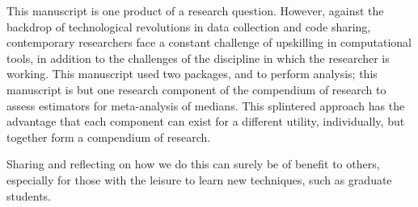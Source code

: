 \documentclass{article}
\begin{document}
This manuscript is one product of a research question. However, against the backdrop of technological revolutions in data collection and code sharing, contemporary researchers face a constant challenge of upskilling in computational tools, in addition to the challenges of the discipline in which the researcher is working. This manuscript used two packages,  and  to perform analysis; this manuscript is but one research component of the compendium of research to assess estimators for meta-analysis of medians. This splintered approach has the advantage that each component can exist for a different utility, individually, but together form a compendium of research.

Sharing and reflecting on how we do this can surely be of benefit to others, especially for those with the leisure to learn new techniques, such as graduate students.


\medskip
\printbibliography
\end{document}
